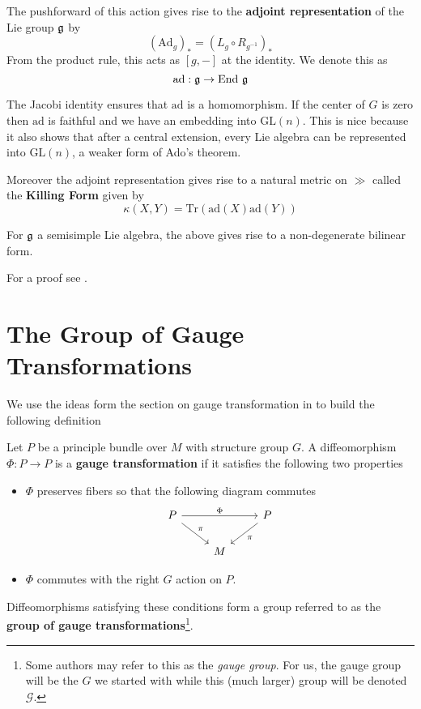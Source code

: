 		\begin{defn}
			The pushforward of this action gives rise to the \textbf{adjoint representation} of the Lie group $\frak g$ by
			\begin{equation}
				(\mathrm{Ad}_g)_* = (L_g \circ R_{g^{-1}})_* 
			\end{equation}
			From the product rule, this acts as $[g, -]$ at the identity. We denote this as
			\begin{equation}
				\mathrm{ad}: \frak g \rightarrow \mathrm{End}~ \frak g
			\end{equation}
		\end{defn}
		
		The Jacobi identity ensures that $\mathrm{ad}$ is a homomorphism. If the center of $G$ is zero then $\mathrm{ad}$ is faithful and we have an embedding into $\mathrm{GL}(n)$. This is nice because it also shows that after a central extension, every Lie algebra can be represented into $\mathrm{GL}(n)$, a weaker form of Ado's theorem.
		
		Moreover the adjoint representation gives rise to a natural metric on $\gg$ called the \textbf{Killing Form} given by
		\begin{equation}
			\kappa (X, Y) = \mathrm{Tr}(\mathrm{ad}(X) \mathrm{ad}(Y))
		\end{equation}
		
		\begin{prop}
			For $\frak g$ a semisimple Lie algebra, the above gives rise to a non-degenerate bilinear form. 
		\end{prop}
		For a proof see \cite{humphreys2012}.
		
		\section{The Group of Gauge Transformations}
		
		We use the ideas form the section on gauge transformation in \cite{lindenhovius2011} to build the following definition
		\begin{defn}
			Let $P$ be a principle bundle over $M$ with structure group $G$. A diffeomorphism $\Phi: P \to P$ is a \textbf{gauge transformation} if it satisfies the following two properties
			\begin{itemize}
				\item $\Phi$ preserves fibers so that the following diagram commutes
				\[
					\begin{tikzcd}
						P \arrow[rr,"\Phi"] \arrow[rd,"\pi"] & & P \arrow[ld,"\pi"]\\
						& M &
					\end{tikzcd}
				\]
				\item $\Phi$ commutes with the right $G$ action on $P$. 
			\end{itemize}
			Diffeomorphisms satisfying these conditions form a group referred to as the \textbf{group of gauge transformations}\footnote{Some authors may refer to this as the \emph{gauge group}. For us, the gauge group will be the $G$ we started with while this (much larger) group will be denoted $\mathcal G$.}. 
		\end{defn}
		
